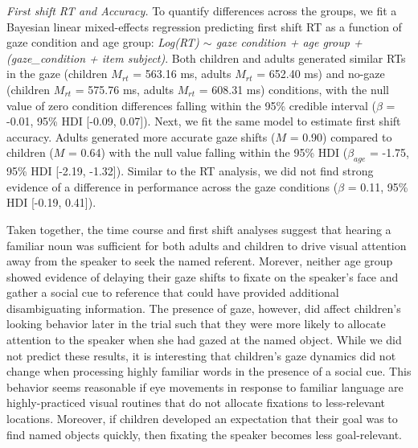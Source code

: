 \documentclass[man,floatsintext]{apa6}
\begin{document}
\emph{First shift RT and Accuracy.} To quantify differences across the
groups, we fit a Bayesian linear mixed-effects regression predicting
first shift RT as a function of gaze condition and age group:
\emph{Log(RT) \(\sim\) gaze condition + age group + (gaze\_condition +
item \textbar{} subject)}. Both children and adults generated similar
RTs in the gaze (children \(M_{rt}\) = 563.16 ms, adults \(M_{rt}\) =
652.40 ms) and no-gaze (children \(M_{rt}\) = 575.76 ms, adults
\(M_{rt}\) = 608.31 ms) conditions, with the null value of zero
condition differences falling within the 95\% credible interval
(\(\beta\) = -0.01, 95\% HDI {[}-0.09, 0.07{]}). Next, we fit the same
model to estimate first shift accuracy. Adults generated more accurate
gaze shifts (\(M\) = 0.90) compared to children (\(M\) = 0.64) with the
null value falling within the 95\% HDI (\(\beta_{age}\) = -1.75, 95\%
HDI {[}-2.19, -1.32{]}). Similar to the RT analysis, we did not find
strong evidence of a difference in performance across the gaze
conditions (\(\beta\) = 0.11, 95\% HDI {[}-0.19, 0.41{]}).

Taken together, the time course and first shift analyses suggest that
hearing a familiar noun was sufficient for both adults and children to
drive visual attention away from the speaker to seek the named referent.
Morever, neither age group showed evidence of delaying their gaze shifts
to fixate on the speaker's face and gather a social cue to reference
that could have provided additional disambiguating information. The
presence of gaze, however, did affect children's looking behavior later
in the trial such that they were more likely to allocate attention to
the speaker when she had gazed at the named object. While we did not
predict these results, it is interesting that children's gaze dynamics
did not change when processing highly familiar words in the presence of
a social cue. This behavior seems reasonable if eye movements in
response to familiar language are highly-practiced visual routines that
do not allocate fixations to less-relevant locations. Moreover, if
children developed an expectation that their goal was to find named
objects quickly, then fixating the speaker becomes less goal-relevant.
\end{document}
